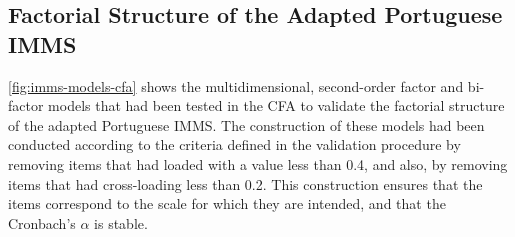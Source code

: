 
\subsection{Factorial Structure of the Adapted Portuguese IMMS}

\autoref{fig:imms-models-cfa} shows the multidimensional, second-order factor and bi-factor models that had been tested in the CFA to validate the factorial structure of the adapted Portuguese IMMS. The construction of these models had been conducted according to the criteria defined in the validation procedure by removing items that had loaded with a value less than 0.4, and also, by removing items that had cross-loading less than 0.2. This construction ensures that the items correspond to the scale for which they are intended, and that the Cronbach’s $\alpha$ is stable.


